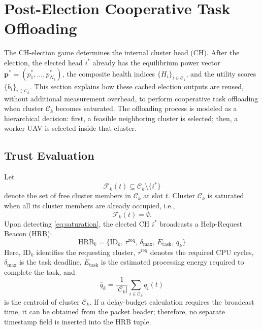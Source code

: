 \documentclass[journal]{IEEEtran}
\begin{document}
\section{Post-Election Cooperative Task Offloading}
\label{sec:offloading}

The CH-election game determines the internal cluster head (CH). After the
election, the elected head $i^{*}$ already has the equilibrium power vector
$\mathbf{p}^{*}=(p_{1}^{*},\ldots,p_{N_{k}}^{*})$, the composite health
indices $\{H_{i}\}_{i\in\mathcal{C}_{k}}$, and the utility scores
$\{b_{i}\}_{i\in\mathcal{C}_{k}}$. This section explains how these cached
election outputs are reused, without additional measurement overhead, to
perform cooperative task offloading when cluster $\mathcal{C}_{k}$ becomes
saturated. The offloading process is modeled as a hierarchical decision:
first, a feasible neighboring cluster is selected; then, a worker UAV is
selected inside that cluster.

\subsection{Trust Evaluation}

Let
\begin{equation}
  \mathcal{F}_{k}(t)\subseteq\mathcal{C}_{k}\setminus\{i^{*}\}
\end{equation}
denote the set of free cluster members in $\mathcal{C}_{k}$ at slot $t$.
Cluster $\mathcal{C}_{k}$ is saturated when all its cluster members are
already occupied, i.e.,
\begin{equation}
  \mathcal{F}_{k}(t)=\emptyset .
  \label{eq:saturation}
\end{equation}
Upon detecting \eqref{eq:saturation}, the elected CH $i^{*}$ broadcasts a
Help-Request Beacon (HRB):
\begin{equation}
  \mathrm{HRB}_{k}=
  \bigl\{\mathrm{ID}_{k},\,\tau^{\mathrm{req}},\,
         \delta_{\max},\,E_{\mathrm{task}},\,
         \bar{q}_{k}\bigr\} 
  \label{eq:hrb}
\end{equation}
Here, $\mathrm{ID}_{k}$ identifies the requesting cluster,
$\tau^{\mathrm{req}}$ denotes the required CPU cycles,
$\delta_{\max}$ is the task deadline, $E_{\mathrm{task}}$ is the estimated
processing energy required to complete the task, and
\begin{equation}
  \bar{q}_{k}=\frac{1}{|\mathcal{C}_{k}|}
  \sum_{i\in\mathcal{C}_{k}}q_{i}(t)
\end{equation}
is the centroid of cluster $\mathcal{C}_{k}$. If a delay-budget calculation
requires the broadcast time, it can be obtained from the packet header;
therefore, no separate timestamp field is inserted into the HRB tuple.
\end{document}
